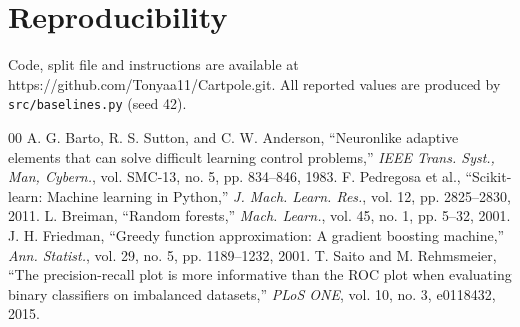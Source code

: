 \documentclass[conference]{IEEEtran}
\begin{document}
\section*{Reproducibility}
Code, split file and instructions are available at https://github.com/Tonyaa11/Cartpole.git. All
reported values are produced by \texttt{src/baselines.py} (seed 42).

\begin{thebibliography}{00}
 A. G. Barto, R. S. Sutton, and C. W. Anderson, ``Neuronlike adaptive elements that can solve difficult learning control problems,'' \emph{IEEE Trans. Syst., Man, Cybern.}, vol. SMC-13, no. 5, pp. 834--846, 1983.
 F. Pedregosa et al., ``Scikit-learn: Machine learning in Python,'' \emph{J. Mach. Learn. Res.}, vol. 12, pp. 2825--2830, 2011.
 L. Breiman, ``Random forests,'' \emph{Mach. Learn.}, vol. 45, no. 1, pp. 5--32, 2001.
 J. H. Friedman, ``Greedy function approximation: A gradient boosting machine,'' \emph{Ann. Statist.}, vol. 29, no. 5, pp. 1189--1232, 2001.
 T. Saito and M. Rehmsmeier, ``The precision-recall plot is more informative than the ROC plot when evaluating binary classifiers on imbalanced datasets,'' \emph{PLoS ONE}, vol. 10, no. 3, e0118432, 2015.
\end{thebibliography}
\end{document}
